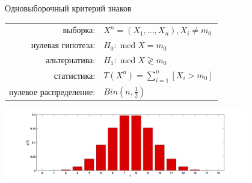 \documentclass[11pt,pdf,utf8,hyperref={unicode},aspectratio=169]{beamer}
\DeclareMathOperator{\med}{med}
\begin{document}
\begin{frame}[label=signtest1]{\hyperlink{classification}{} Одновыборочный критерий знаков}
 \begin{center}
     \begin{tabular}{rl}
         выборка:                        & $X^n=\left(X_1,\ldots,X_n\right), X_i \neq m_0$         \\
         нулевая гипотеза:               & $H_0\colon \med X = m_0$ \\
         альтернатива:                   & $H_1\colon \med X \gtrless m_0$ \\
         статистика:                     & $T\left(X^n\right) = \sum\limits_{i=1}^n \left[X_i>m_0\right]$\\
         нулевое распределение:          & $Bin(n,\frac1{2})$\\
     \end{tabular}
     \includegraphics[width=0.8\textwidth]{bin.png}
 \end{center}
\end{frame}
\end{document}
